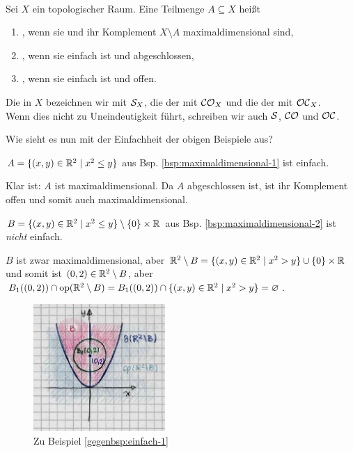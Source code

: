     \begin{dfn}\label{def:einf}\ \\
        Sei $X$ ein topologischer Raum. Eine Teilmenge $A \subseteq X$ heißt 
        \begin{enumerate}
            \item {}, wenn sie und ihr Komplement $X \setminus A$ maximaldimensional sind,
            \item {}, wenn sie einfach ist und abgeschlossen,
            \item {}, wenn sie einfach ist und offen.
        \end{enumerate}
        Die  in $X$ bezeichnen wir mit $\mathcal{S}_X$, die der  mit $\mathcal{CO}_X$ und die der  mit $\mathcal{OC}_X$.\\
        Wenn dies nicht zu Uneindeutigkeit führt, schreiben wir auch $\mathcal{S}$, $\mathcal{CO}$ und $\mathcal{OC}$.
    \end{dfn}
    
    Wie sieht es nun mit der Einfachheit der obigen Beispiele aus?
    \begin{bsp}\label{bsp:einfach}
        $A = \{(x,y) \in \mathbb{R}^2 \mid x^2 \leq y\}$ aus Bsp. \ref{bsp:maximaldimensional-1} ist einfach.
    \end{bsp}
    \begin{bew}
        Klar ist: $A$ ist maximaldimensional. Da $A$ abgeschlossen ist, ist ihr Komplement offen und somit auch maximaldimensional.
    \end{bew}

    \begin{gegenbsp}\label{gegenbsp:einfach-1}
        $B = \{(x,y) \in \mathbb{R}^2 \mid x^2 \leq y\} \setminus \{0\} \times \mathbb{R}$ aus Bsp. \ref{bsp:maximaldimensional-2} ist \textit{nicht} einfach.
    \end{gegenbsp}
    \begin{bew}
        $B$ ist zwar maximaldimensional, aber $\mathbb{R}^2 \setminus B = \{(x,y) \in \mathbb{R}^2 \mid x^2 > y\} \cup \{0\} \times \mathbb{R}$ und somit ist $(0,2) \in \mathbb{R}^2 \setminus B$, aber $B_1((0,2)) \cap \text{op}(\mathbb{R}^2 \setminus B) = B_1((0,2)) \cap \{(x,y) \in \mathbb{R}^2 \mid x^2 > y\} = \varnothing$.
    \end{bew}
    \begin{figure}[ht]
        \centering
        \includegraphics[width=5cm]{abb/nicht-einfach.png}
        \caption{Zu Beispiel \ref{gegenbsp:einfach-1}}
        \label{fig:nicht-einfach}
    \end{figure}


